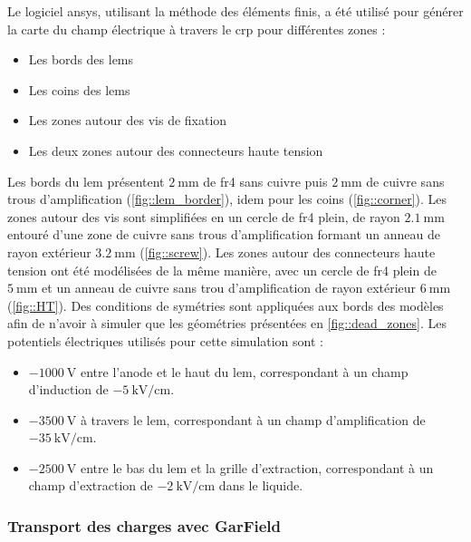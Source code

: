         Le logiciel \gls{ansys}, utilisant la méthode des éléments finis, a été utilisé pour générer la carte du champ électrique à travers le \gls{crp} pour différentes zones :
        \begin{itemize}
          \item Les bords des \glspl{lem}
          \item Les coins des \glspl{lem}
          \item Les zones autour des vis de fixation
          \item Les deux zones autour des connecteurs haute tension
        \end{itemize}
        Les bords du \gls{lem} présentent $\SI{2}{\milli\meter}$ de \gls{fr4} sans cuivre puis $\SI{2}{\milli\meter}$ de cuivre sans trous d'amplification (\autoref{fig::lem_border}), idem pour les coins (\autoref{fig::corner}). Les zones autour des vis sont simplifiées en un cercle de \gls{fr4} plein, de rayon $\SI{2.1}{\milli\meter}$ entouré d'une zone de cuivre sans trous d'amplification formant un anneau de rayon extérieur $\SI{3.2}{\milli\meter}$ (\autoref{fig::screw}). Les zones autour des connecteurs haute tension ont été modélisées de la même manière, avec un cercle de \gls{fr4} plein de $\SI{5}{\milli\meter}$ et un anneau de cuivre sans trou d'amplification de rayon extérieur $\SI{6}{\milli\meter}$ (\autoref{fig::HT}). Des conditions de symétries sont appliquées aux bords des modèles afin de n'avoir à simuler que les géométries présentées en \autoref{fig::dead_zones}. 
        Les potentiels électriques utilisés pour cette simulation sont : 
        \begin{itemize}
          \item $\SI{-1000}{\volt}$ entre l'anode et le haut du \gls{lem}, correspondant à un champ d'induction de $\SI{-5}{\kilo\volt\per\centi\meter}$.
          \item $\SI{-3500}{\volt}$ à travers le \gls{lem}, correspondant à un champ d'amplification de $\SI{-35}{\kilo\volt\per\centi\meter}$.
          \item $\SI{-2500}{\volt}$ entre le bas du \gls{lem} et la grille d'extraction, correspondant à un champ d'extraction de $\SI{-2}{\kilo\volt\per\centi\meter}$ dans le liquide.
        \end{itemize}
                
      \subsubsection{Transport des charges avec GarField}
            
